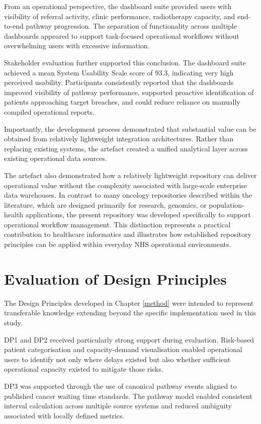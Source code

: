 From an operational perspective, the dashboard suite provided users with visibility of referral activity, clinic performance, radiotherapy capacity, and end-to-end pathway progression. The separation of functionality across multiple dashboards appeared to support task-focused operational workflows without overwhelming users with excessive information. 

Stakeholder evaluation further supported this conclusion. The dashboard suite achieved a mean System Usability Scale score of 93.3, indicating very high perceived usability. Participants consistently reported that the dashboards improved visibility of pathway performance, supported proactive identification of patients approaching target breaches, and could reduce reliance on manually compiled operational reports.

Importantly, the development process demonstrated that substantial value can be obtained from relatively lightweight integration architectures. Rather than replacing existing systems, the artefact created a unified analytical layer across existing operational data sources.

The artefact also demonstrated how a relatively lightweight repository can deliver operational value without the complexity associated with large-scale enterprise data warehouses. In contrast to many oncology repositories described within the literature, which are designed primarily for research, genomics, or population-health applications, the present repository was developed specifically to support operational workflow management. This distinction represents a practical contribution to healthcare informatics and illustrates how established repository principles can be applied within everyday NHS operational environments. 

\section{Evaluation of Design Principles}
The Design Principles developed in Chapter \ref{method} were intended to represent transferable knowledge extending beyond the specific implementation used in this study. 

DP1 and DP2 received particularly strong support during evaluation. Risk-based patient categorisation and capacity-demand visualisation enabled operational users to identify not only where delays existed but also whether sufficient operational capacity existed to mitigate those risks. 

DP3 was supported through the use of canonical pathway events aligned to published cancer waiting time standards. The pathway model enabled consistent interval calculation across multiple source systems and reduced ambiguity associated with locally defined metrics. 

